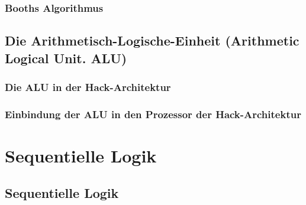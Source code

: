 \documentclass[12pt]{report}
\begin{document}
\subsection{Booths Algorithmus}


\section{Die Arithmetisch-Logische-Einheit (Arithmetic Logical Unit. ALU)}
\subsection{Die ALU in der Hack-Architektur}
\subsection{Einbindung der ALU in den Prozessor der Hack-Architektur}


\chapter{Sequentielle Logik}
\section{Sequentielle Logik}
\end{document}

